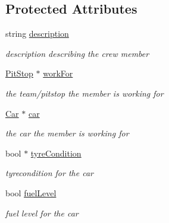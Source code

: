 \subsection*{Protected Attributes}
\begin{DoxyCompactItemize}
\item 
\mbox{\label{class_pit_crew_abf4690db656612bf89f0abe024756924}} 
string \mbox{\hyperlink{class_pit_crew_abf4690db656612bf89f0abe024756924}{description}}
\begin{DoxyCompactList}\small\item\em description describing the crew member \end{DoxyCompactList}\item 
\mbox{\label{class_pit_crew_a95c5984868479e4084bfcc24b4693ff9}} 
\mbox{\hyperlink{class_pit_stop}{Pit\+Stop}} $\ast$ \mbox{\hyperlink{class_pit_crew_a95c5984868479e4084bfcc24b4693ff9}{work\+For}}
\begin{DoxyCompactList}\small\item\em the team/pitstop the member is working for \end{DoxyCompactList}\item 
\mbox{\label{class_pit_crew_ae2d97d82c1ae7061faf9b053329772e5}} 
\mbox{\hyperlink{class_car}{Car}} $\ast$ \mbox{\hyperlink{class_pit_crew_ae2d97d82c1ae7061faf9b053329772e5}{car}}
\begin{DoxyCompactList}\small\item\em the car the member is working for \end{DoxyCompactList}\item 
\mbox{\label{class_pit_crew_add6d2560b553a1359bfb68a6a4d80332}} 
bool $\ast$ \mbox{\hyperlink{class_pit_crew_add6d2560b553a1359bfb68a6a4d80332}{tyre\+Condition}}
\begin{DoxyCompactList}\small\item\em tyrecondition for the car \end{DoxyCompactList}\item 
\mbox{\label{class_pit_crew_ad45840fa02b11a128e069ffcc7fdde47}} 
bool \mbox{\hyperlink{class_pit_crew_ad45840fa02b11a128e069ffcc7fdde47}{fuel\+Level}}
\begin{DoxyCompactList}\small\item\em fuel level for the car \end{DoxyCompactList}\item 

\end{DoxyCompactItemize}
